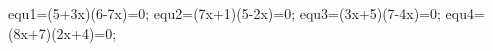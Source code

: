 \documentclass[exercice]{thedocument}%
\begin{document}
%
    \>equ1=(5+3x)(6-7x)=0;%
    \>equ2=(7x+1)(5-2x)=0;%
    \>equ3=(3x+5)(7-4x)=0;%
    \>equ4=(8x+7)(2x+4)=0;%
\end{document}
